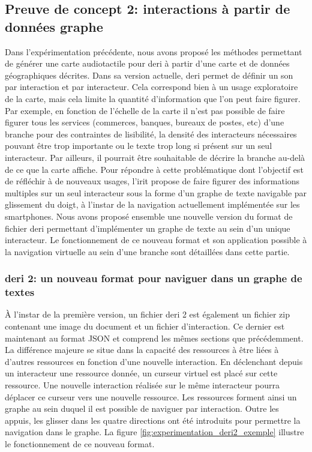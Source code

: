 \subsection{Preuve de concept 2: interactions à partir de données graphe}

\label{sec:experimentation_poc2}


Dans l'expérimentation précédente, nous avons proposé les méthodes permettant de générer une carte audiotactile pour \gls{deri} à partir d'une carte et de données géographiques décrites. Dans sa version actuelle, \gls{deri} permet de définir un son par interaction et par interacteur. Cela correspond bien à un usage exploratoire de la carte, mais cela limite la quantité d'information que l'on peut faire figurer. Par exemple, en fonction de l'échelle de la carte il n'est pas possible de faire figurer tous les services (commerces, banques, bureaux de postes, etc) d'une branche pour des contraintes de lisibilité, la densité des interacteurs nécessaires pouvant être trop importante ou le texte trop long si présent sur un seul interacteur. Par ailleurs, il pourrait être souhaitable de décrire la branche au-delà de ce que la carte affiche. Pour répondre à cette problématique dont l'objectif est de réfléchir à de nouveaux usages, l'\gls{irit} propose de faire figurer des informations multiples sur un seul interacteur sous la forme d'un graphe de texte navigable par glissement du doigt, à l'instar de la navigation actuellement implémentée sur les smartphones. Nous avons proposé ensemble une nouvelle version du format de fichier \gls{deri} permettant d'implémenter un graphe de texte au sein d'un unique interacteur. Le fonctionnement de ce nouveau format et son application possible à la navigation virtuelle au sein d'une branche sont détaillées dans cette partie.

\subsubsection{\gls{deri} 2: un nouveau format pour naviguer dans un graphe de textes}

À l'instar de la première version, un fichier \gls{deri} 2 est également un fichier zip contenant une image du document et un fichier d'interaction. Ce dernier est maintenant au format JSON et comprend les mêmes sections que précédemment. La différence majeure se situe dans la capacité des ressources à être liées à d'autres ressources en fonction d'une nouvelle interaction. En déclenchant depuis un interacteur une ressource donnée, un curseur virtuel est placé sur cette ressource. Une nouvelle interaction réalisée sur le même interacteur pourra déplacer ce curseur vers une nouvelle ressource. Les ressources forment ainsi un graphe au sein duquel il est possible de naviguer par interaction. Outre les appuis, les glisser dans les quatre directions ont été introduits pour permettre la navigation dans le graphe. La figure \ref{fig:experimentation_deri2_exemple} illustre le fonctionnement de ce nouveau format.

